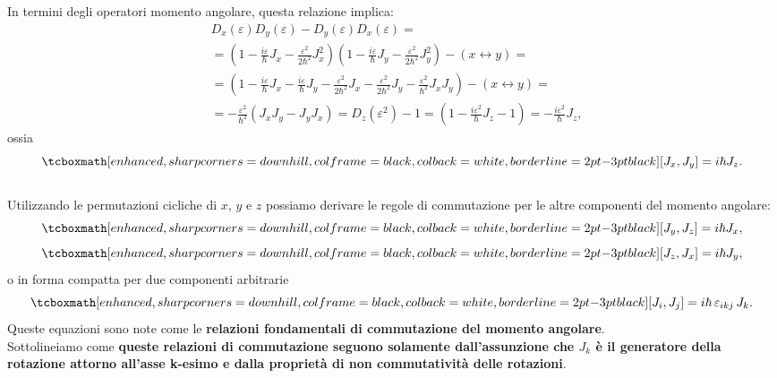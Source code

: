 \documentclass[a4paper,12pt,oneside]{book}
\begin{document}
In termini degli operatori momento angolare, questa relazione implica:
	\begin{align}
		& D_x (\varepsilon)D_y (\varepsilon)-D_y (\varepsilon)D_x (\varepsilon)= \nonumber\\
		&  = \left(1-\frac{i\varepsilon}{\hbar} J_x -\frac{\varepsilon ^2}{2\hbar ^2}J_x ^2\right)\left(1-\frac{i\varepsilon}{\hbar} J_y -\frac{\varepsilon ^2}{2\hbar ^2}J_y ^2\right)- \left( x \leftrightarrow y\right) =\nonumber \\
		& = \left(1-\frac{i\varepsilon}{\hbar} J_x-\frac{i\varepsilon}{\hbar} J_y-\frac{\varepsilon ^2}{2\hbar ^2}J_x-\frac{\varepsilon ^2}{2\hbar ^2}J_y-\frac{\varepsilon ^2}{\hbar ^2}J_xJ_y \right) - \left( x \leftrightarrow y\right) = \nonumber \\
		&  = -\frac{\varepsilon ^2}{\hbar ^2}\left(J_xJ_y-J_y J_x\right) = D_z (\varepsilon ^2)- 1= \left(1-\frac{i\varepsilon ^2}{\hbar} J_z-1\right)=-\frac{i\varepsilon ^2}{\hbar} J_z, 
	\end{align}
ossia
	\begin{equation}
		\tcboxmath[enhanced, sharp corners=downhill, colframe=black, colback=white, borderline={2pt}{-3pt}{black}]{
			[ J_x, J_y ] = i\hbar J_z.
			 }
	\end{equation}\\
	
Utilizzando le permutazioni cicliche di $x$, $y$ e $z$ possiamo derivare le regole di commutazione per le altre componenti del momento angolare:
	\begin{equation}
		\tcboxmath[enhanced, sharp corners=downhill, colframe=black, colback=white, borderline={2pt}{-3pt}{black}]{
			[ J_y, J_z ] = i\hbar J_x,
			}
	\end{equation}
	\begin{equation}
		\tcboxmath[enhanced, sharp corners=downhill, colframe=black, colback=white, borderline={2pt}{-3pt}{black}]{
			[ J_z, J_x ] = i\hbar J_y,
			}
	\end{equation}
o in forma compatta per due componenti arbitrarie
	\begin{equation}
		\tcboxmath[enhanced, sharp corners=downhill, colframe=black, colback=white, borderline={2pt}{-3pt}{black}]{
			[ J_i, J_j ] = i\hbar\, \varepsilon _{ikj}\,J_k.
			}
	\label{eq:cap16_1}
	\end{equation}
Queste equazioni sono note come le \textbf{relazioni fondamentali di commutazione del momento angolare}.\\

Sottolineiamo come \textbf{queste relazioni di commutazione seguono solamente dall'assunzione che $J_k$ è il generatore della rotazione attorno all'asse k-esimo e dalla proprietà di non commutatività delle rotazioni}.\\
\end{document}
